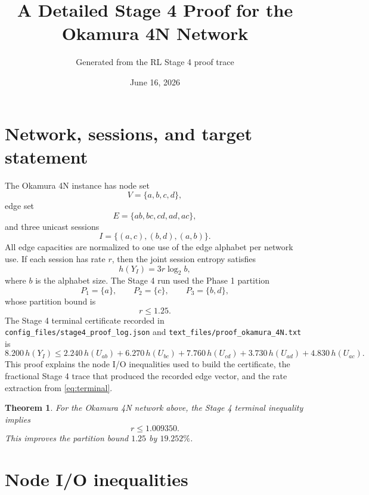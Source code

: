 \documentclass[11pt]{article}
\title{A Detailed Stage 4 Proof for the Okamura 4N Network}
\author{Generated from the RL Stage 4 proof trace}
\date{June 16, 2026}
\newtheorem{theorem}{Theorem}
\newcommand{\YI}{Y_I}
\newcommand{\U}[2]{U_{#1#2}}
\begin{document}
\maketitle

\section{Network, sessions, and target statement}

The Okamura 4N instance has node set
\[
V=\{a,b,c,d\},
\]
edge set
\[
E=\{ab,bc,cd,ad,ac\},
\]
and three unicast sessions
\[
I=\{(a,c),(b,d),(a,b)\}.
\]
All edge capacities are normalized to one use of the edge alphabet per network
use.  If each session has rate \(r\), then the joint session entropy satisfies
\[
h(\YI)=3r\log_2 b,
\]
where \(b\) is the alphabet size.  The Stage 4 run used the Phase 1 partition
\[
P_1=\{a\},\qquad P_2=\{c\},\qquad P_3=\{b,d\},
\]
whose partition bound is
\[
r\leq 1.25.
\]
The Stage 4 terminal certificate recorded in
\texttt{config\_files/stage4\_proof\_log.json} and
\texttt{text\_files/proof\_okamura\_4N.txt} is
\begin{equation}
\label{eq:terminal}
8.200\,h(\YI)
\leq
2.240\,h(\U{a}{b})
+6.270\,h(\U{b}{c})
+7.760\,h(\U{c}{d})
+3.730\,h(\U{a}{d})
+4.830\,h(\U{a}{c}).
\end{equation}
This proof explains the node I/O inequalities used to build the certificate,
the fractional Stage 4 trace that produced the recorded edge vector, and the
rate extraction from \eqref{eq:terminal}.

\begin{theorem}
For the Okamura 4N network above, the Stage 4 terminal inequality implies
\[
r\leq 1.009350.
\]
This improves the partition bound \(1.25\) by \(19.252\%\).
\end{theorem}

\section{Node I/O inequalities}
\end{document}
